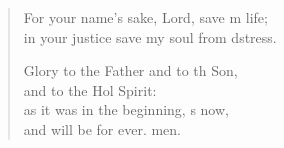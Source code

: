 \begin{verse}
\begin{patverse}
    For your name’s sake, Lord, save m life;\Med\\
    in your justice save my soul from d\pointup{\i}stress.

    Glory to the Father and to th Son,\Med\\
    and to the Hol Spirit:\\
    as it was in the beginning, \pointup{\i}s now,\Med\\
    and will be for ever. men.
  \end{patverse}
  \end{verse}
